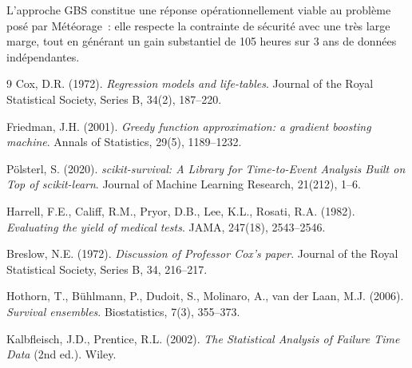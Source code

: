\documentclass[a4paper,11pt]{article}
\begin{document}
\medskip

L'approche GBS constitue une réponse opérationnellement viable au problème posé par Météorage~:
elle respecte la contrainte de sécurité avec une très large marge, tout en générant un gain
substantiel de 105 heures sur 3 ans de données indépendantes.

\newpage
\begin{thebibliography}{9}
  Cox, D.R. (1972). \textit{Regression models and life-tables}. Journal of the Royal Statistical
  Society, Series B, 34(2), 187--220.

  Friedman, J.H. (2001). \textit{Greedy function approximation: a gradient boosting machine}.
  Annals of Statistics, 29(5), 1189--1232.

  Pölsterl, S. (2020). \textit{scikit-survival: A Library for Time-to-Event Analysis Built on
  Top of scikit-learn}. Journal of Machine Learning Research, 21(212), 1--6.

  Harrell, F.E., Califf, R.M., Pryor, D.B., Lee, K.L., Rosati, R.A. (1982).
  \textit{Evaluating the yield of medical tests}. JAMA, 247(18), 2543--2546.

  Breslow, N.E. (1972). \textit{Discussion of Professor Cox's paper}. Journal of the Royal
  Statistical Society, Series B, 34, 216--217.

  Hothorn, T., Bühlmann, P., Dudoit, S., Molinaro, A., van der Laan, M.J. (2006).
  \textit{Survival ensembles}. Biostatistics, 7(3), 355--373.

  Kalbfleisch, J.D., Prentice, R.L. (2002). \textit{The Statistical Analysis of Failure
  Time Data} (2nd ed.). Wiley.
\end{thebibliography}
\end{document}

